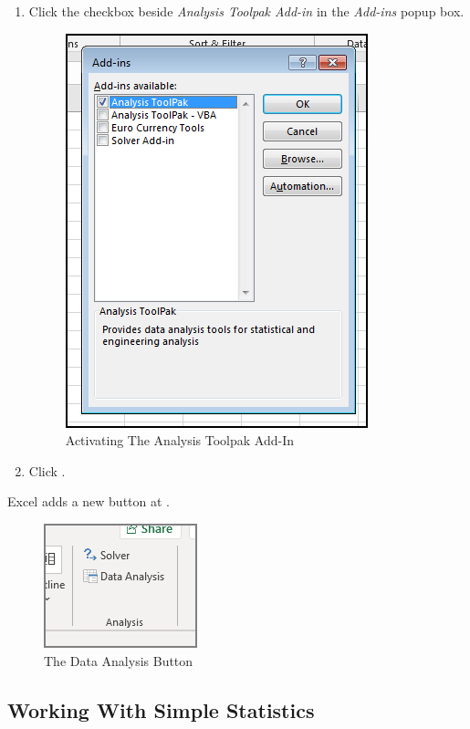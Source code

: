 \begin{enumbox}
\begin{enumerate}
		\item Click the checkbox beside \textit{Analysis Toolpak Add-in} in the \textit{Add-ins} popup box. 
	
		\begin{figure}[H]
			\centering
			\includegraphics[width=\maxwidth{.75\linewidth}]{gfx/ch09_fig52}
			\caption{Activating The Analysis Toolpak Add-In}
			\label{09:fig52}
		\end{figure}

		\item Click .
	\end{enumerate}
\end{enumbox}

Excel adds a new button at .

\begin{figure}[H]
	\centering
	\includegraphics[width=\maxwidth{.35\linewidth}]{gfx/ch09_fig53}
	\caption{The Data Analysis Button}
	\label{09:fig53}
\end{figure}

\subsection{Working With Simple Statistics}

